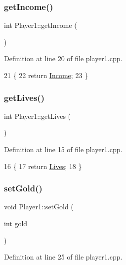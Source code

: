 \subsubsection{\texorpdfstring{get\+Income()}{getIncome()}}
{\footnotesize\ttfamily int Player1\+::get\+Income (\begin{DoxyParamCaption}{ }\end{DoxyParamCaption})}



Definition at line 20 of file player1.\+cpp.


\begin{DoxyCode}
21 \{
22     \textcolor{keywordflow}{return} \hyperlink{class_player1_a414fae948c79246f6a98554718f0cd99}{Income};
23 \}
\end{DoxyCode}
\mbox{\label{class_player1_afb2adc7bd83c6380fbb85a832e083f4d}} 
\subsubsection{\texorpdfstring{get\+Lives()}{getLives()}}
{\footnotesize\ttfamily int Player1\+::get\+Lives (\begin{DoxyParamCaption}{ }\end{DoxyParamCaption})}



Definition at line 15 of file player1.\+cpp.


\begin{DoxyCode}
16 \{
17     \textcolor{keywordflow}{return} \hyperlink{class_player1_aacba034528d5c9fdefa4f246fe526a38}{Lives};
18 \}
\end{DoxyCode}
\mbox{\label{class_player1_afb8807754032eba459edf031bb344653}} 
\subsubsection{\texorpdfstring{set\+Gold()}{setGold()}}
{\footnotesize\ttfamily void Player1\+::set\+Gold (\begin{DoxyParamCaption}\item[{int}]{gold }\end{DoxyParamCaption})}



Definition at line 25 of file player1.\+cpp.


